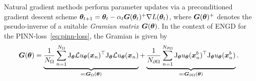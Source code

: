 Natural gradient methods perform parameter updates via a preconditioned gradient descent scheme ${\bm{\theta}}_{t+1} = {\bm{\theta}}_t - \alpha_t {\bm{G}}({\bm{\theta}}_t)^+\nabla L({\bm{\theta}}_t)$, where ${\bm{G}}({\bm{\theta}})^+$ denotes the pseudo-inverse of a suitable \emph{Gramian matrix} ${\bm{G}}({\bm{\theta}})$.
In the context of ENGD for the PINN-loss~\eqref{eq:pinn-loss}, the Gramian is given by
\begin{equation}\label{eq:gramian}
  \mG(\vtheta) = %
  \underbrace{\frac1{{N_\Omega}} \sum_{n=1}^{N_\Omega} \jac_{\vtheta} \mathcal{L} u_\vtheta(\vx_n)^\top \jac_{\vtheta} \mathcal{L} u_\vtheta(\vx_n)}_{\eqqcolon \mG_\Omega(\vtheta)} + \underbrace{\frac1{{N_{\partial\Omega}}} \sum_{n=1}^{N_{\partial\Omega}} \jac_{\vtheta} u_\vtheta(\vx_n^b)^\top \jac_{\vtheta} u_\vtheta (\vx_n^b)}_{\eqqcolon \mG_{\partial\Omega}(\vtheta)}.
\end{equation}


